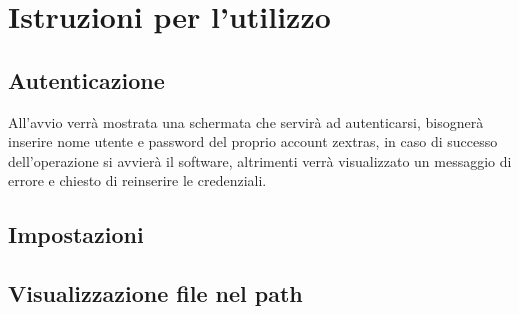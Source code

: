 \section{Istruzioni per l'utilizzo}
\subsection{Autenticazione}

All'avvio verrà mostrata una schermata che servirà ad autenticarsi, bisognerà inserire nome utente e password del proprio account zextras, in caso di successo dell'operazione si avvierà il software, altrimenti verrà visualizzato un messaggio di errore e chiesto di reinserire le credenziali.

\subsection{Impostazioni}


\subsection{Visualizzazione file nel path}